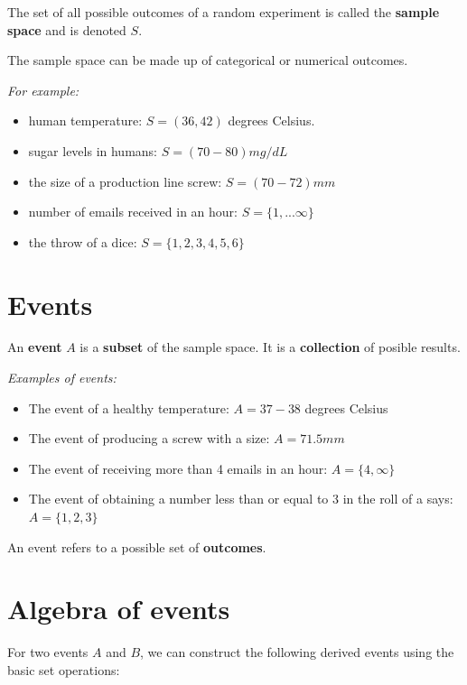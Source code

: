 \documentclass[
]{book}
\providecommand{\tightlist}{%
  \setlength{\itemsep}{0pt}\setlength{\parskip}{0pt}}
\begin{document}
The set of all possible outcomes of a random experiment is called the \textbf{sample space} and is denoted \(S\).

The sample space can be made up of categorical or numerical outcomes.

\emph{For example:}

\begin{itemize}
\tightlist
\item
  human temperature: \(S = (36, 42)\) degrees Celsius.
\item
  sugar levels in humans: \(S =( 70-80) mg/ dL\)
\item
  the size of a production line screw: \(S =( 70-72) mm\)
\item
  number of emails received in an hour: \(S = \{ 1, ...\infty \}\)
\item
  the throw of a dice: \(S= \{ 1, 2, 3, 4, 5, 6\}\)
\end{itemize}

\hypertarget{events}{%
\section{Events}\label{events}}

An \textbf{event} \(A\) is a \textbf{subset} of the sample space. It is a \textbf{collection} of posible results.

\emph{Examples of events:}

\begin{itemize}
\tightlist
\item
  The event of a healthy temperature: \(A=37-38\) degrees Celsius
\item
  The event of producing a screw with a size: \(A=71.5mm\)
\item
  The event of receiving more than 4 emails in an hour: \(A= \{ 4, \infty \}\)
\item
  The event of obtaining a number less than or equal to 3 in the roll of a says: \(A= \{ 1,2,3\}\)
\end{itemize}

An event refers to a possible set of \textbf{outcomes}.

\hypertarget{algebra-of-events}{%
\section{Algebra of events}\label{algebra-of-events}}

For two events \(A\) and \(B\), we can construct the following derived events using the basic set operations:
\end{document}
